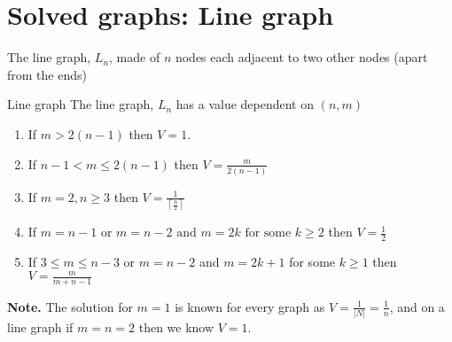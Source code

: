 \documentclass[11pt]{beamer}
\newcommand{\ceil}[1]{\left \lceil #1 \right \rceil}
\begin{document}
\section[]{Solved graphs: Line graph}
\hypertarget{Solved graphs: Line graph}{}
\begin{frame}{\insertsection}

The line graph, $L_{n}$, made of $n$ nodes each adjacent to two other nodes (apart from the ends)

\begin{block}{Line graph}
The line graph, $L_{n}$ has a value dependent on $(n,m)$
\begin{enumerate}
\item If $m > 2(n-1)$ then $V=1$.
\item If $n-1 < m \leq 2(n-1)$ then $V=\frac{m}{2(n-1)}$
\item If $m=2 , n\geq 3$ then $V=\frac{1}{\ceil{\frac{n}{2}}}$
\item If $m=n-1 \text{ or } m=n-2  \text{ and } m=2k \text{ for some } k \geq 2 $ then $V=\frac{1}{2}$
\item If $3 \leq m \leq n-3$ or  $m=n-2$ and $m=2k+1$ for some  $k \geq 1$ then $V=\frac{m}{m+n-1}$
\end{enumerate}
\end{block}
\textbf{Note.} The solution for $m=1$ is known for every graph as $V=\frac{1}{|N|}=\frac{1}{n}$, and on a line graph if $m=n=2$ then we know $V=1$.
\end{frame}
\end{document}
